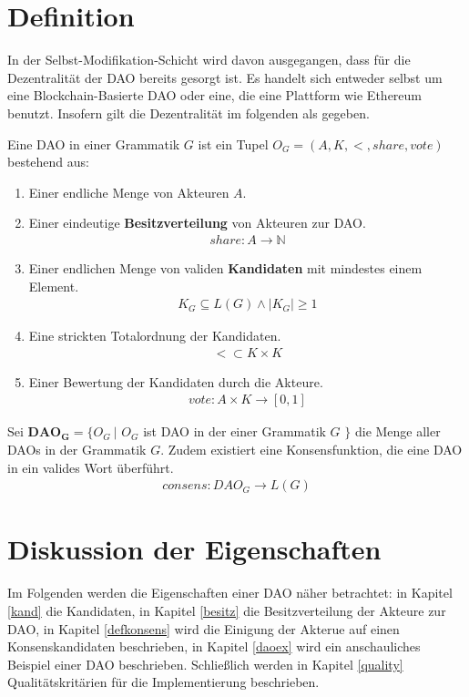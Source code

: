 \documentclass[a4paper,12pt]{report}
\begin{document}
\section{Definition}
\label{smoddef}
In der Selbst-Modifikation-Schicht wird davon ausgegangen, dass für die Dezentralität der DAO bereits gesorgt ist. Es handelt sich entweder selbst um eine Blockchain-Basierte DAO oder eine, die eine Plattform wie Ethereum benutzt. Insofern gilt die Dezentralität im folgenden als gegeben.

Eine DAO in einer Grammatik $G$ ist ein Tupel $O_G=(A, K, <, share, vote)$ bestehend aus:

\begin{enumerate}
\item Einer endliche Menge von Akteuren $A$.
\item Einer eindeutige \textbf{Besitzverteilung} von Akteuren zur DAO.
\begin{eqnarray}
  share: A \rightarrow \mathbb{N}
\end{eqnarray}
\item Einer endlichen Menge von validen \textbf{Kandidaten} mit mindestes einem Element.
\begin{eqnarray}
  K_G \subseteq L(G) \land |K_G| \geq 1
\end{eqnarray}
\item Eine strickten Totalordnung der Kandidaten.
\begin{eqnarray}
   < \subset K\times K 
\end{eqnarray}
\item Einer Bewertung der Kandidaten durch die Akteure.
\begin{eqnarray}
  vote: A\times K \rightarrow [0,1]
\end{eqnarray}
\end{enumerate}

Sei $\mathbf{DAO_G} = \{ O_G\ |$ $O_G$ ist DAO in der einer Grammatik $G$ $\}$ die Menge aller DAOs in der Grammatik $G$.  
Zudem existiert eine Konsensfunktion, die eine DAO in ein valides Wort überführt. 
\begin{eqnarray}
  consens: DAO_G \rightarrow L(G)
\end{eqnarray}


\section{Diskussion der Eigenschaften}
\label{smoddiskuss}

Im Folgenden werden die Eigenschaften einer DAO näher betrachtet: in Kapitel \ref{kand} die Kandidaten, in Kapitel \ref{besitz} die Besitzverteilung der Akteure zur DAO, in Kapitel \ref{defkonsens} wird die Einigung der Akterue auf einen Konsenskandidaten beschrieben, in Kapitel \ref{daoex} wird ein anschauliches Beispiel einer DAO beschrieben. Schließlich werden in Kapitel \ref{quality} Qualitätskritärien für die Implementierung beschrieben.
\end{document}
